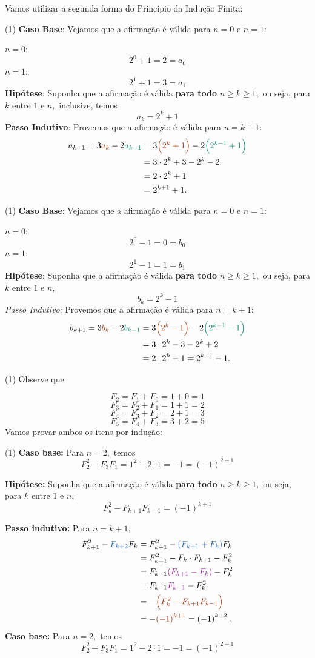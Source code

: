 \documentclass[12pt, a4paper]{article}
\newcommand{\negrito}[1]{\mbox{\boldmath{$#1$}}}
\newcommand{\itens}[1]{\begin{tasks}[label={(tsk[a])},label-width=3.6ex, label-format = {\bfseries}, column-sep = {0pt}](1) #1\end{tasks}}
\newcommand{\alt}[1]{\textcolor{Floresta}{$\negrito{(#1)} $}}
\begin{document}
\begin{solution}
Vamos utilizar a segunda forma do Princípio da Indução Finita:
\itens{
\task[\alt{a}] \textbf{Caso Base}: Vejamos que a afirmação é válida para $n = 0$ e $n = 1:$
}
$n=0$: $$2^{0}+1=2=a_{0}$$
$n=1$: $$2^{1}+1=3=a_{1}$$
\textbf{Hipótese}: Suponha que a afirmação é válida \textbf{para todo} $n \geq k \geq 1,$ ou seja, para $k$ entre $1$ e $n,$ inclusive, temos
$$a_{k}=2^{k}+1$$
\textbf{Passo Indutivo}: Provemos que a afirmação é válida para $n=k+1:$
\begin{align*}
    a_{k+1}=3\textcolor{RawSienna}{a_{k}}-2 \textcolor{PineGreen}{a_{k-1}}&=3 \textcolor{RawSienna}{\left( 2^{k}+1 \right)} -2 \textcolor{PineGreen}{\left( 2^{k-1}+1 \right)}\\ &=3\cdot 2^{k}+3-2^{k}-2\\ &=
2\cdot2^{k}+1\\ &=2^{k+1}+1.
\end{align*}
\itens{
\task[\alt{b}] \textbf{Caso Base}: Vejamos que a afirmação é válida para $n = 0$ e $n = 1:$}
$n=0$: $$2^{0}-1=0=b_{0}$$
$n=1$: $$2^{1}-1=1=b_{1}$$
\textbf{Hipótese}: Suponha que a afirmação é válida \textbf{para todo} $n \geq k \geq 1,$ ou seja, para $k$ entre $1$ e $n,$
$$b_{k}=2^{k}-1$$
\textit{Passo Indutivo}: Provemos que a afirmação é válida para $n=k+1:$
\begin{align*}
b_{k+1}=3\textcolor{RawSienna}{b_{k}}-2\textcolor{PineGreen}{b_{k-1}}&=3 \textcolor{RawSienna}{\left( 2^{k}-1 \right)} -2 \textcolor{PineGreen}{\left( 2^{k-1}-1 \right)} \\&=3\cdot2^{k}-3-2^{k}+2\\&=
2\cdot2^{k}-1=2^{k+1}-1.
\end{align*}
\itens{
\task[\alt{c}] Observe que}
$$F_{2}=F_{1}+F_{0}=1+0=1$$
$$F_{3}=F_{2}+F_{1}=1+1=2$$
$$F_{4}=F_{3}+F_{2}=2+1=3$$
$$F_{5}=F_{4}+F_{3}=3+2=5$$
Vamos provar ambos os itens por indução:
\itens{
\task[\alt{i}] \textbf{Caso base:} Para $n = 2,$ temos 
 $$F_{2}^{2}-F_{3}F_{1}=1^{2}-2\cdot1=-1= \left( -1 \right) ^{2+1}$$
 
 \textbf{Hipótese:} Suponha que a afirmação é válida \textbf{para todo} $n \geq k \geq 1,$ ou seja, para $k$ entre $1$ e $n,$
 $$F_{k}^{2}-F_{k+1}F_{k-1}= \left( -1 \right) ^{k+1}$$
 
 \textbf{Passo indutivo:} Para $n = k+1,$
 \begin{align*}
F_{k+1}^{2}-\textcolor{NavyBlue}{F_{k+2}}F_{k}&=F_{k+1}^{2}- \textcolor{NavyBlue}{\left( F_{k+1}+F_{k} \right)} F_{k}\\&=F_{k+1}^{2}-F_{k}\cdot F_{k+1}-F_{k}^{2}\\&=
F_{k+1} \textcolor{Plum}{\left( F_{k+1}-F_{k} \right)} -F_{k}^{2}\\&= F_{k+1}\textcolor{Plum}{F_{k-1}}-F_{k}^{2}\\&=
- \textcolor{RawSienna}{\left( F_{k}^{2}-F_{k+1}F_{k-1} \right)} \\&=-\textcolor{RawSienna}{ \left( -1 \right) ^{k+1}}= \left( -1 \right) ^{k+2}.
\end{align*}
\task[\alt{ii}] \textbf{Caso base:} Para $n = 2,$ temos 
 $$F_{2}^{2}-F_{3}F_{1}=1^{2}-2\cdot1=-1= \left( -1 \right) ^{2+1}$$
 
}
\end{solution}
\end{document}
